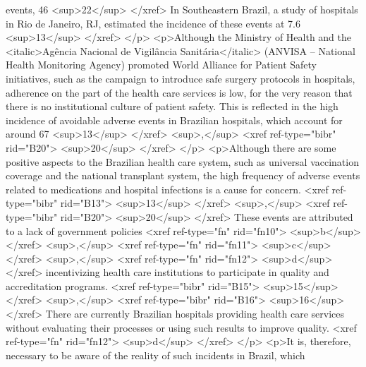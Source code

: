           events, 46%
            <sup>22</sup>
          </xref> In Southeastern Brazil, a study of hospitals in Rio de Janeiro, RJ, estimated the
          incidence of these events at 7.6%
            <sup>13</sup>
          </xref>
        </p>
        <p>Although the Ministry of Health and the <italic>Agência Nacional de Vigilância
            Sanitária</italic> (ANVISA – National Health Monitoring Agency) promoted World Alliance
          for Patient Safety initiatives, such as the campaign to introduce safe surgery protocols
          in hospitals, adherence on the part of the health care services is low, for the very
          reason that there is no institutional culture of patient safety. This is reflected in the
          high incidence of avoidable adverse events in Brazilian hospitals, which account for
          around 67%
            <sup>13</sup>
          </xref>
          <sup>,</sup>
          <xref ref-type="bibr" rid="B20">
            <sup>20</sup>
          </xref>
        </p>
        <p>Although there are some positive aspects to the Brazilian health care system, such as
          universal vaccination coverage and the national transplant system, the high frequency of
          adverse events related to medications and hospital infections is a cause for concern.
            <xref ref-type="bibr" rid="B13">
            <sup>13</sup>
          </xref>
          <sup>,</sup>
          <xref ref-type="bibr" rid="B20">
            <sup>20</sup>
          </xref> These events are attributed to a lack of government policies <xref ref-type="fn"
            rid="fn10">
            <sup>b</sup>
          </xref>
          <sup>,</sup>
          <xref ref-type="fn" rid="fn11">
            <sup>c</sup>
          </xref>
          <sup>,</sup>
          <xref ref-type="fn" rid="fn12">
            <sup>d</sup>
          </xref> incentivizing health care institutions to participate in quality and accreditation
          programs. <xref ref-type="bibr" rid="B15">
            <sup>15</sup>
          </xref>
          <sup>,</sup>
          <xref ref-type="bibr" rid="B16">
            <sup>16</sup>
          </xref> There are currently Brazilian hospitals providing health care services without
          evaluating their processes or using such results to improve quality. <xref ref-type="fn"
            rid="fn12">
            <sup>d</sup>
          </xref>
        </p>
        <p>It is, therefore, necessary to be aware of the reality of such incidents in Brazil, which

